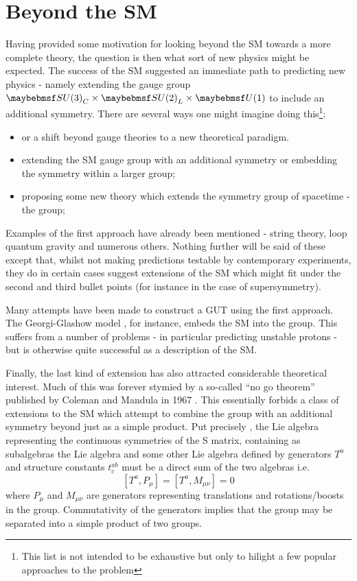 \section{Beyond the \acl{SM}}
Having provided some motivation for looking beyond the \ac{SM} towards a more
complete theory, the question is then what sort of new physics might be
expected. The success of the \ac{SM} suggested an immediate path to predicting
new physics - namely extending the gauge group
$\SUthree_C\times\SUtwo_L\times\Uone$ to include an additional symmetry. There
are several ways one might imagine doing this\footnote{This list is not intended
  to be exhaustive but only to hilight a few popular approaches to the problem}:
\begin{itemize}
\item or a shift beyond gauge theories to a new theoretical paradigm.
\item extending the \ac{SM} gauge group with an additional symmetry or embedding
  the symmetry within a larger group;
\item proposing some new theory which extends the symmetry group of spacetime -
  the \Poincare group;
\end{itemize}

Examples of the first approach have already been mentioned - string theory, loop
quantum gravity and numerous others. Nothing further will be said of these
except that, whilst not making predictions testable by contemporary experiments,
they do in certain cases suggest extensions of the \ac{SM} which might fit under
the second and third bullet points (for instance in the case of supersymmetry).

Many attempts have been made to construct a \acl{GUT} using the first
approach. The Georgi-Glashow model \cite{georgi_glashow}, for instance, embeds
the \ac{SM} into the \SUfive group. This suffers from a number of problems - in
particular predicting unstable protons - but is otherwise quite successful as a
description of the \ac{SM}.

Finally, the last kind of extension has also attracted considerable theoretical
interest. Much of this was forever stymied by a so-called ``no go theorem''
published by Coleman and Mandula in 1967 \cite{coleman_mandula}. This
essentially forbids a class of extensions to the \ac{SM} which attempt to
combine the \Poincare group with an additional symmetry beyond just as a simple
product. Put precisely \cite{sparticles}, the Lie algebra representing the
continuous symmetries of the S matrix, containing as subalgebras the \Poincare
Lie algebra and some other Lie algebra defined by generators $T^a$ and structure
constants $t^{ab}_c$ must be a direct sum of the two algebras i.e.
\begin{equation}
\left[T^a, P_{\mu}\right] = \left[T^a, M_{\mu\nu}\right] = 0
\end{equation}
where $P_{\mu}$ and $M_{\mu\nu}$ are generators representing translations and
rotations/boosts in the \Poincare group. Commutativity of the generators implies
that the group may be separated into a simple product of two groups.

